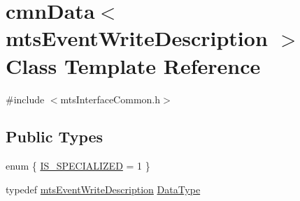\hypertarget{classcmn_data_3_01mts_event_write_description_01_4}{}\section{cmn\+Data$<$ mts\+Event\+Write\+Description $>$ Class Template Reference}
\label{classcmn_data_3_01mts_event_write_description_01_4}


{\ttfamily \#include $<$mts\+Interface\+Common.\+h$>$}

\subsection*{Public Types}
\begin{DoxyCompactItemize}
\item 
enum \{ \hyperlink{classcmn_data_3_01mts_event_write_description_01_4_a0b218a98ec9e414df903e270b08953a4ad99cc06b86ea1a9f70fb975444b212b7}{I\+S\+\_\+\+S\+P\+E\+C\+I\+A\+L\+I\+Z\+E\+D} = 1
 \}
\item 
typedef \hyperlink{classmts_event_write_description}{mts\+Event\+Write\+Description} \hyperlink{classcmn_data_3_01mts_event_write_description_01_4_a0c398e4adf26c99124f9f6cd19fb70dc}{Data\+Type}
\end{DoxyCompactItemize}

